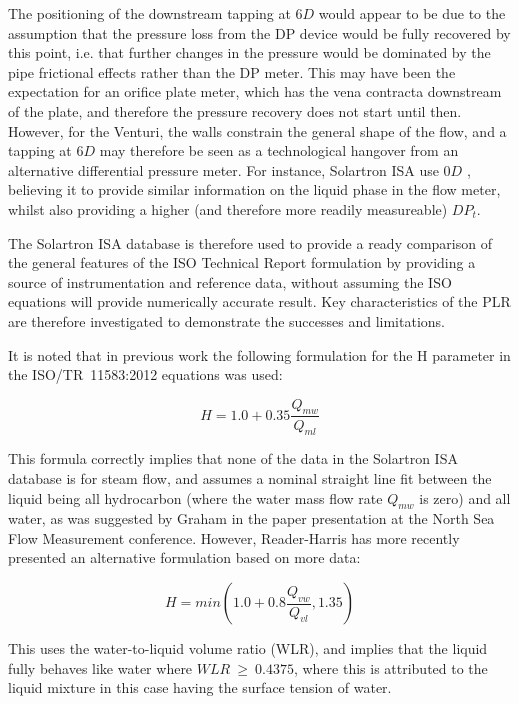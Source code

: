 \documentclass[journal]{IEEEtran}
\begin{document}
The positioning of the downstream tapping at $6D$ would appear to be due to the assumption that the pressure loss from the DP device would be fully recovered by this point, i.e. that further changes in the pressure would be dominated by the pipe frictional effects rather than the DP meter.  This may have been the expectation for an orifice plate meter, which has the vena contracta downstream of the plate, and therefore the pressure recovery does not start until then.  However, for the Venturi, the walls constrain the general shape of the flow, and a tapping at $6D$ may therefore be seen as a technological hangover from an alternative differential pressure meter.  For instance, Solartron ISA use $0D$ \cite{Collins2017PLR1}, believing it to provide similar information on the liquid phase in the flow meter, whilst also providing a higher (and therefore more readily measureable) $DP_{t}$.

The Solartron ISA database is therefore used to provide a ready comparison of the general features of the ISO Technical Report formulation by providing a source of instrumentation and reference data, without assuming the ISO equations will provide numerically accurate result.  Key characteristics of the PLR are therefore investigated to demonstrate the successes and limitations.

It is noted that in previous work \cite{Collins2015} the following formulation for the \acrshort{H} parameter in the ISO/TR~11583:2012 \cite{2012ISO/TRConduits} equations was used:

\begin{equation}
H = 1.0 + 0.35 \frac{Q_{mw}}{Q_{ml}}    
\end{equation}

This formula correctly implies that none of the data in the Solartron ISA database is for steam flow, and assumes a nominal straight line fit between the liquid being all hydrocarbon (where the water mass flow rate $Q_{mw}$ is zero) and all water, as was suggested by Graham in the paper presentation at the North Sea Flow Measurement conference.  However, Reader-Harris has more recently presented an alternative formulation \cite{Reader-Harris2017} based on more data:

\begin{equation}
H = min \left( 1.0 + 0.8 \frac{Q_{vw}}{Q_{vl}}, 1.35 \right)    
\end{equation}

This uses the water-to-liquid volume ratio (WLR), and implies that the liquid fully behaves like water where $WLR~\geq~0.4375$, where this is attributed to the liquid mixture in this case having the surface tension of water.
\end{document}
